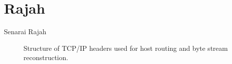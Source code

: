 \chapter{Rajah}

Senarai Rajah

\begin{figure}
    \caption[Structure of TCP/IP headers]{Structure of TCP/IP headers used for host
    routing and byte stream reconstruction.}
    \label{c2:f1}
\end{figure}
